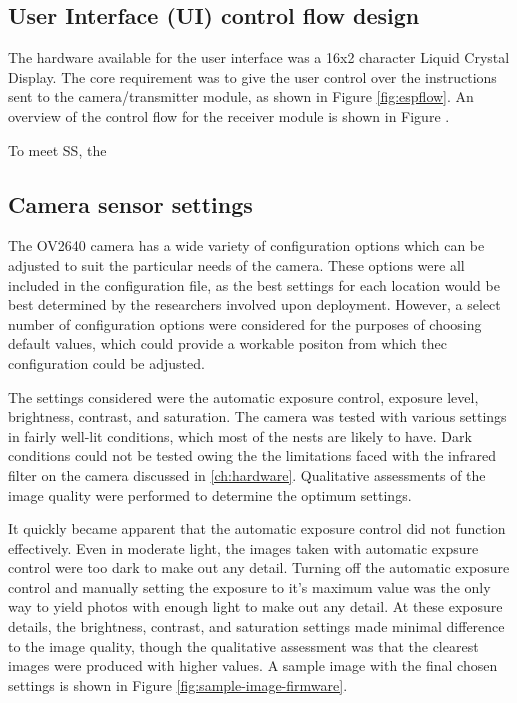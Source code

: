 \documentclass[class=report,11pt,crop=false]{standalone}
\begin{document}
\subsection{User Interface (UI) control flow design}

The hardware available for the user interface was a 16x2 character Liquid Crystal Display. The core requirement was to give the user control over the instructions sent to the camera/transmitter module, as shown in Figure \ref{fig:espflow}. An overview of the control flow for the receiver module is shown in Figure .

To meet SS, the 

\subsection{Camera sensor settings}

The OV2640 camera has a wide variety of configuration options which can be adjusted to suit the particular needs of the camera. These options were all included in the configuration file, as the best settings for each location would be best determined by the researchers involved upon deployment. However, a select number of configuration options were considered for the purposes of choosing default values, which could provide a workable positon from which thec configuration could be adjusted. 

The settings considered were the automatic exposure control, exposure level, brightness, contrast, and saturation. The camera was tested with various settings in fairly well-lit conditions, which most of the nests are likely to have. Dark conditions could not be tested owing the the limitations faced with the infrared filter on the camera discussed in \ref{ch:hardware}. Qualitative assessments of the image quality were performed to determine the optimum settings.

It quickly became apparent that the automatic exposure control did not function effectively. Even in moderate light, the images taken with automatic expsure control were too dark to make out any detail. Turning off the automatic exposure control and manually setting the exposure to it's maximum value was the only way to yield photos with enough light to make out any detail. At these exposure details, the brightness, contrast, and saturation settings made minimal difference to the image quality, though the qualitative assessment was that the clearest images were produced with higher values. A sample image with the final chosen settings is shown in Figure \ref{fig:sample-image-firmware}.
\end{document}
